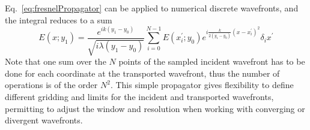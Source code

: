 \documentclass[]{spie}  %
\begin{document}
Eq.~\ref{eq:fresnelPropagator} can be applied to numerical discrete wavefronts, and the integral reduces to a sum
\begin{equation}\label{eq:discretefresnel1D}
 E(x;y_1) = \frac {e^{i k (y_1-y_0) }}{ \sqrt{i \lambda (y_1-y_0)}} \sum_{i=0}^{N-1}  E(x^\prime_i; y_0) e^{i \frac{k}{2 (y_1-y_0)} (x - x_i^\prime)^2 } \delta_i x^\prime
\end{equation}
Note that one sum over the $N$ points of the sampled incident wavefront has to be done for each coordinate at the transported wavefront, thus the number of operations is of the order $N^2$. This simple propagator gives flexibility to define different gridding and limits for the incident and transported wavefronts, permitting to adjust the window and resolution when working with converging or divergent wavefronts. 
\end{document}

